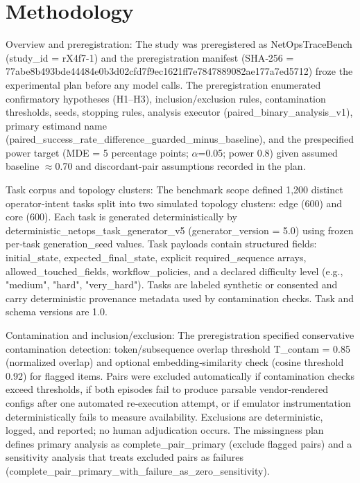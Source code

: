 \documentclass[conference]{IEEEtran}
\begin{document}
\section{Methodology}
Overview and preregistration: The study was preregistered as NetOpsTraceBench (study\_id = rX4f7-1) and the preregistration manifest (SHA‑256 = 77abe8b4\allowbreak{}93bde444\allowbreak{}84e0b3d0\allowbreak{}2cfd7f9e\allowbreak{}c1621ff7\allowbreak{}e7847889\allowbreak{}082ae177\allowbreak{}a7ed5712) froze the experimental plan before any model calls. The preregistration enumerated confirmatory hypotheses (H1--H3), inclusion/exclusion rules, contamination thresholds, seeds, stopping rules, analysis executor (paired\_binary\_analysis\_v1), primary estimand name (paired\_success\_rate\_difference\_guarded\_minus\_baseline), and the prespecified power target (MDE = 5 percentage points; \ensuremath{\alpha}=0.05; power 0.8) given assumed baseline \ensuremath{\approx}0.70 and discordant‑pair assumptions recorded in the plan.

Task corpus and topology clusters: The benchmark scope defined 1,200 distinct operator‑intent tasks split into two simulated topology clusters: edge (600) and core (600). Each task is generated deterministically by deterministic\_netops\_task\_generator\_v5 (generator\_version = 5.0) using frozen per‑task generation\_seed values. Task payloads contain structured fields: initial\_state, expected\_final\_state, explicit required\_sequence arrays, allowed\_touched\_fields, workflow\_policies, and a declared difficulty level (e.g., "medium", "hard", "very\_hard"). Tasks are labeled synthetic or consented and carry deterministic provenance metadata used by contamination checks. Task and schema versions are 1.0.

Contamination and inclusion/exclusion: The preregistration specified conservative contamination detection: token/subsequence overlap threshold T\_contam = 0.85 (normalized overlap) and optional embedding‑similarity check (cosine threshold 0.92) for flagged items. Pairs were excluded automatically if contamination checks exceed thresholds, if both episodes fail to produce parsable vendor‑rendered configs after one automated re‑execution attempt, or if emulator instrumentation deterministically fails to measure availability. Exclusions are deterministic, logged, and reported; no human adjudication occurs. The missingness plan defines primary analysis as complete\_pair\_primary (exclude flagged pairs) and a sensitivity analysis that treats excluded pairs as failures (complete\_pair\_primary\_with\_failure\_as\_zero\_sensitivity).
\end{document}
